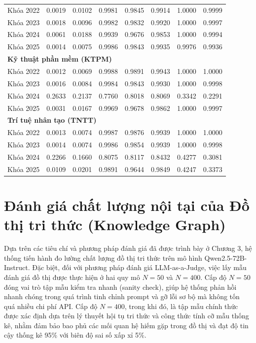\begin{table}[H]
{\begin{tabular}{|l|c|c|c|c|c|c|c|}
            Khóa 2022 & 0.0019 & 0.0102 & 0.9981 & 0.9845 & 0.9914 & 1.0000 & 0.9999 \\
            Khóa 2023 & 0.0018 & 0.0096 & 0.9982 & 0.9832 & 0.9920 & 1.0000 & 0.9997 \\
            Khóa 2024 & 0.0061 & 0.0188 & 0.9939 & 0.9676 & 0.9853 & 1.0000 & 0.9994 \\
            Khóa 2025 & 0.0014 & 0.0075 & 0.9986 & 0.9843 & 0.9935 & 0.9976 & 0.9936 \\
            \hline
            \multicolumn{8}{|l|}{\textbf{Kỹ thuật phần mềm (KTPM)}} \\ \hline
            Khóa 2022 & 0.0012 & 0.0069 & 0.9988 & 0.9891 & 0.9943 & 1.0000 & 1.0000 \\
            Khóa 2023 & 0.0016 & 0.0084 & 0.9984 & 0.9843 & 0.9930 & 1.0000 & 0.9998 \\
            Khóa 2024 & 0.2633 & 0.2137 & 0.7760 & 0.8018 & 0.8069 & 0.3342 & 0.2291 \\
            Khóa 2025 & 0.0031 & 0.0167 & 0.9969 & 0.9678 & 0.9862 & 1.0000 & 0.9997 \\
            \hline
            \multicolumn{8}{|l|}{\textbf{Trí tuệ nhân tạo (TNTT)}} \\ \hline
            Khóa 2022 & 0.0013 & 0.0074 & 0.9987 & 0.9876 & 0.9939 & 1.0000 & 1.0000 \\
            Khóa 2023 & 0.0014 & 0.0074 & 0.9986 & 0.9854 & 0.9939 & 1.0000 & 0.9998 \\
            Khóa 2024 & 0.2266 & 0.1660 & 0.8075 & 0.8117 & 0.8432 & 0.4277 & 0.3081 \\
            Khóa 2025 & 0.0109 & 0.0201 & 0.9891 & 0.9644 & 0.9849 & 0.4247 & 0.3373 \\
			\hline
		\end{tabular}
	}
\end{table}


\section{Đánh giá chất lượng nội tại của Đồ thị tri thức (Knowledge Graph)}

Dựa trên các tiêu chí và phương pháp đánh giá đã được trình bày ở Chương 3, hệ thống tiến hành đo lường chất lượng đồ thị tri thức trên mô hình Qwen2.5-72B-Instruct. Đặc biệt, đối với phương pháp đánh giá LLM-as-a-Judge, việc lấy mẫu đánh giá đồ thị được thực hiện ở hai quy mô $N=50$ và $N=400$. Cấp độ $N=50$ đóng vai trò tập mẫu kiểm tra nhanh (sanity check), giúp hệ thống phản hồi nhanh chóng trong quá trình tinh chỉnh prompt và gỡ lỗi sơ bộ mà không tốn quá nhiều chi phí API. Cấp độ $N=400$, trong khi đó, là tập mẫu chính thức được xác định dựa trên lý thuyết hội tụ tri thức và công thức tính cỡ mẫu thống kê, nhằm đảm bảo bao phủ các mối quan hệ hiếm gặp trong đồ thị và đạt độ tin cậy thống kê 95\% với biên độ sai số xấp xỉ 5\%.

